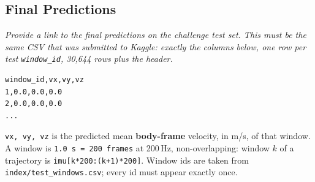\documentclass[letterpaper,10pt,conference]{ieeeconf}
\newcommand{\instruction}[1]{\textcolor{instructionblue}{\textit{#1}}}
\begin{document}

\subsection{Final Predictions}

\instruction{
Provide a link to the final predictions on the challenge test set. This must be
the same CSV that was submitted to Kaggle: exactly the columns below, one row
per test \texttt{window\_id}, 30,644 rows plus the header.
}

\begin{verbatim}
window_id,vx,vy,vz
1,0.0,0.0,0.0
2,0.0,0.0,0.0
...
\end{verbatim}

\noindent
\texttt{vx, vy, vz} is the predicted mean \textbf{body-frame} velocity, in m/s,
of that window. A window is \texttt{1.0 s = 200 frames} at 200\,Hz,
non-overlapping: window $k$ of a trajectory is \texttt{imu[k*200:(k+1)*200]}.
Window ids are taken from \texttt{index/test\_windows.csv}; every id must appear
exactly once.
\end{document}
